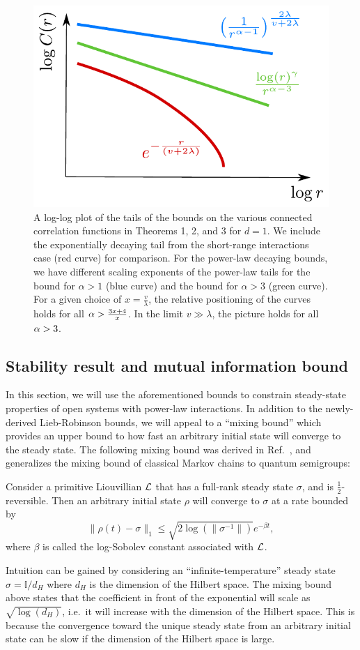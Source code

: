 \begin{figure}[h]
\centering
\label{fig:model1}
\includegraphics[width=.45\textwidth]{figures/light-cones-log.pdf}
\caption[Clustering of correlations curves]{A log-log plot of the tails of the bounds on the various connected correlation functions in Theorems 1, 2, and 3 for $d = 1$. We include the exponentially decaying tail from the short-range interactions case (red curve) for comparison.
For the power-law decaying bounds, we have different scaling exponents of the power-law tails for the bound for $\alpha >1$ (blue curve) and the bound for $\alpha > 3$ (green curve).
For a given choice of $x = \frac v\lambda$, the relative positioning of the curves
holds for all $\alpha > \frac{3x+4}{x}$.
In the limit $v \gg \lambda$, the picture holds for all $\alpha > 3$.}
  \label{fig:light-cone-scalings}
\end{figure}

\subsection{Stability result and mutual information bound}
In this section, we will  use the aforementioned bounds to constrain steady-state properties of open systems with power-law interactions.
In addition to the newly-derived Lieb-Robinson bounds,  we will  appeal to a ``mixing bound'' which provides an upper bound to how fast an arbitrary initial state will converge to the steady state. The following mixing bound was derived in Ref.~\cite{Kastoryano2013d}, and generalizes the mixing bound of classical Markov chains to quantum semigroups:

\begin{lemma}
  \label{cor:mixing}
    Consider a  primitive Liouvillian $\mathcal{L}$ that has a  full-rank steady state  $\sigma$, and is $\frac12$-reversible. Then an arbitrary initial state $\rho$ will converge to $\sigma$ at a rate bounded by
    \begin{equation}
        \lVert \rho(t) - \sigma \lVert_1 \leq \sqrt{2 \log( \lVert \sigma^{-1} \lVert )} e^{-\beta t},
    \end{equation}
    where $\beta$ is called the log-Sobolev constant associated with $\mathcal{L}$.
\end{lemma}
Intuition can be gained by considering an  ``infinite-temperature'' steady state $\sigma = \mathbb{I} /
d_{H}$ where $ d_{H}$ is the dimension of the Hilbert space.  The mixing bound above states that the coefficient in front of the exponential will  scale as $\sqrt{\log(d_{H})}$, i.e.~it will increase with the dimension of the Hilbert space. This is because the convergence toward the unique steady state from an arbitrary initial state can be slow if the dimension of the Hilbert space is large.


